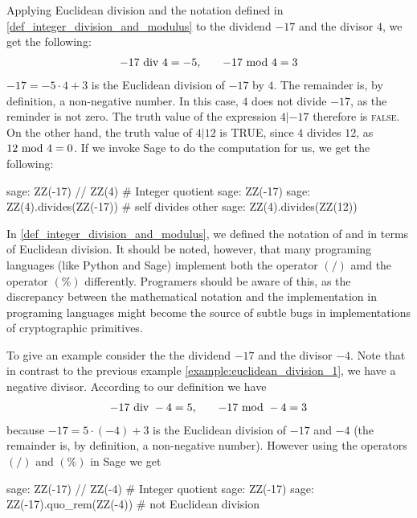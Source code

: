 \begin{example}
\label{example:euclidean_division_1}
 Applying Euclidean division and the notation defined in \ref{def_integer_division_and_modulus} to the dividend $-17$ and the divisor $4$, we get the following:
\begin{equation}
\begin{array}{lcr}
-17 \text{ div } 4 = - 5, & & -17 \text{ mod } 4 = 3
\end{array}
\end{equation}
$ -17 = -5 \cdot 4 + 3 $  is the Euclidean division of $-17$ by $4$. The remainder is, by definition, a non-negative number. In this case, $4$ does not divide $-17$, as the reminder is not zero. The truth value of the expression $4 | -17 $ therefore is \textsc{false}. On the other hand, the truth value of $4 | 12$ is TRUE, since $4$ divides $12$, as $ 12 \text{ mod } 4 = 0 $. If we invoke Sage to do the computation for us, we get the following:
\begin{sagecommandline}
sage: ZZ(-17) // ZZ(4) # Integer quotient
sage: ZZ(-17) %
sage: ZZ(4).divides(ZZ(-17)) # self divides other
sage: ZZ(4).divides(ZZ(12))
\end{sagecommandline}
\end{example}
\begin{remark} In \ref{def_integer_division_and_modulus}, we defined the notation of   and  in terms of Euclidean division. It should be noted, however, that many programing languages (like Python and Sage) implement both the operator $(/)$ amd the operator $(\%)$ differently. Programers should be aware of this, as the discrepancy between the mathematical notation and the implementation in programing languages might become the source of subtle bugs in implementations of cryptographic primitives.

To give an example consider the the dividend $-17$ and the divisor $-4$. Note that in contrast to the previous example \ref{example:euclidean_division_1}, we have a negative divisor. According to our definition we have
\begin{equation*}
\begin{array}{lcr}
-17 \text{ div } -4 = 5, & & -17 \text{ mod } -4 = 3
\end{array}
\end{equation*}
because $ -17 = 5 \cdot (-4) + 3 $  is the Euclidean division of $-17$ and $-4$ (the remainder is, by definition, a non-negative number). However using the operators $(/)$ and $(\%)$ in Sage we get
\begin{sagecommandline}
sage: ZZ(-17) // ZZ(-4) # Integer quotient
sage: ZZ(-17) %
sage: ZZ(-17).quo_rem(ZZ(-4)) # not Euclidean division
\end{sagecommandline}
\end{remark}

